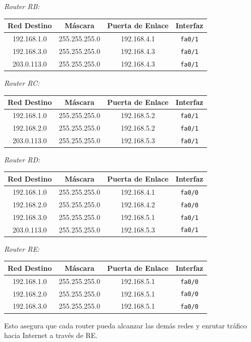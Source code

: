 \documentclass[a4paper,12pt]{article}
\begin{document}
\textit{Router RB:}
\begin{tabular}{|c|c|c|c|}
\hline
Red Destino & Máscara & Puerta de Enlace & Interfaz \\
\hline
192.168.1.0 & 255.255.255.0 & 192.168.4.1 & \texttt{fa0/1} \\
192.168.3.0 & 255.255.255.0 & 192.168.4.3 & \texttt{fa0/1} \\
203.0.113.0 & 255.255.255.0 & 192.168.4.3 & \texttt{fa0/1} \\
\hline
\end{tabular}

\textit{Router RC:}
\begin{tabular}{|c|c|c|c|}
\hline
Red Destino & Máscara & Puerta de Enlace & Interfaz \\
\hline
192.168.1.0 & 255.255.255.0 & 192.168.5.2 & \texttt{fa0/1} \\
192.168.2.0 & 255.255.255.0 & 192.168.5.2 & \texttt{fa0/1} \\
203.0.113.0 & 255.255.255.0 & 192.168.5.3 & \texttt{fa0/1} \\
\hline
\end{tabular}

\textit{Router RD:}
\begin{tabular}{|c|c|c|c|}
\hline
Red Destino & Máscara & Puerta de Enlace & Interfaz \\
\hline
192.168.1.0 & 255.255.255.0 & 192.168.4.1 & \texttt{fa0/0} \\
192.168.2.0 & 255.255.255.0 & 192.168.4.2 & \texttt{fa0/0} \\
192.168.3.0 & 255.255.255.0 & 192.168.5.1 & \texttt{fa0/1} \\
203.0.113.0 & 255.255.255.0 & 192.168.5.3 & \texttt{fa0/1} \\
\hline
\end{tabular}

\textit{Router RE:}
\begin{tabular}{|c|c|c|c|}
\hline
Red Destino & Máscara & Puerta de Enlace & Interfaz \\
\hline
192.168.1.0 & 255.255.255.0 & 192.168.5.1 & \texttt{fa0/0} \\
192.168.2.0 & 255.255.255.0 & 192.168.5.1 & \texttt{fa0/0} \\
192.168.3.0 & 255.255.255.0 & 192.168.5.1 & \texttt{fa0/0} \\
\hline
\end{tabular}

Esto asegura que cada router pueda alcanzar las demás redes y enrutar tráfico hacia Internet a través de RE.
\end{document}
